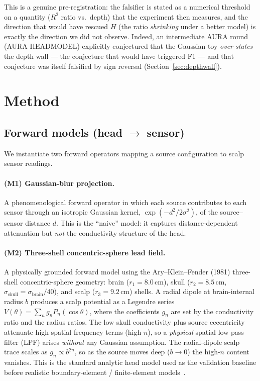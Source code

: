 \documentclass[11pt]{article}
\newcommand{\Rsq}{R^{2}}
\begin{document}
This is a genuine pre-registration: the falsifier is stated as a numerical threshold
on a quantity ($\Rsq$ ratio vs.\ depth) that the experiment then measures, and the
direction that would have rescued $H$ (the ratio \emph{shrinking} under a better
model) is exactly the direction we did not observe. Indeed, an intermediate AURA
round (AURA-HEADMODEL) explicitly conjectured that the Gaussian toy
\emph{over-states} the depth wall --- the conjecture that would have triggered F1 ---
and that conjecture was itself falsified by sign reversal (Section~\ref{sec:depthwall}).

\section{Method}
\label{sec:method}

\subsection{Forward models (head $\rightarrow$ sensor)}
We instantiate two forward operators mapping a source configuration to scalp sensor
readings.

\paragraph{(M1) Gaussian-blur projection.} A phenomenological forward operator in
which each source contributes to each sensor through an isotropic Gaussian kernel,
$\exp(-d^2/2\sigma^2)$, of the source--sensor distance $d$. This is the ``naive''
model: it captures distance-dependent attenuation but \emph{not} the conductivity
structure of the head.

\paragraph{(M2) Three-shell concentric-sphere lead field.} A physically grounded
forward model using the Ary--Klein--Fender (1981) three-shell concentric-sphere
geometry: brain ($r_1=8.0$\,cm), skull ($r_2=8.5$\,cm,
$\sigma_{\text{skull}}=\sigma_{\text{brain}}/40$), and scalp ($r_3=9.2$\,cm) shells.
A radial dipole at brain-internal radius $b$ produces a scalp potential as a Legendre
series $V(\theta)=\sum_n g_n P_n(\cos\theta)$, where the coefficients $g_n$ are set
by the conductivity ratio and the radius ratios. The low skull conductivity plus
source eccentricity attenuate high spatial-frequency terms (high $n$), so a
\emph{physical} spatial low-pass filter (LPF) arises \emph{without} any Gaussian
assumption. The radial-dipole scalp trace scales as $g_n \propto b^{2n}$, so as the
source moves deep ($b\to 0$) the high-$n$ content vanishes. This is the standard
analytic head model used as the validation baseline before realistic
boundary-element / finite-element models~\cite{ary1981,nunez2006,darvas2004}.
\end{document}
